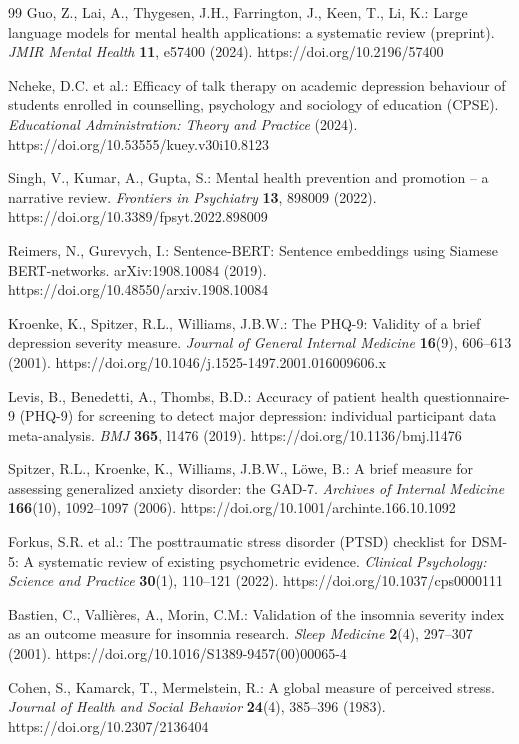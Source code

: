 \documentclass[sigconf]{acmart}
\begin{document}
\begin{thebibliography}{99}
 Guo, Z., Lai, A., Thygesen, J.H., Farrington, J., Keen, T., Li, K.: Large language models for mental health applications: a systematic review (preprint). \textit{JMIR Mental Health} \textbf{11}, e57400 (2024). https://doi.org/10.2196/57400

 Ncheke, D.C. et al.: Efficacy of talk therapy on academic depression behaviour of students enrolled in counselling, psychology and sociology of education (CPSE). \textit{Educational Administration: Theory and Practice} (2024). https://doi.org/10.53555/kuey.v30i10.8123

 Singh, V., Kumar, A., Gupta, S.: Mental health prevention and promotion -- a narrative review. \textit{Frontiers in Psychiatry} \textbf{13}, 898009 (2022). https://doi.org/10.3389/fpsyt.2022.898009

 Reimers, N., Gurevych, I.: Sentence-BERT: Sentence embeddings using Siamese BERT-networks. arXiv:1908.10084 (2019). https://doi.org/10.48550/arxiv.1908.10084

 Kroenke, K., Spitzer, R.L., Williams, J.B.W.: The PHQ-9: Validity of a brief depression severity measure. \textit{Journal of General Internal Medicine} \textbf{16}(9), 606--613 (2001). https://doi.org/10.1046/j.1525-1497.2001.016009606.x

 Levis, B., Benedetti, A., Thombs, B.D.: Accuracy of patient health questionnaire-9 (PHQ-9) for screening to detect major depression: individual participant data meta-analysis. \textit{BMJ} \textbf{365}, l1476 (2019). https://doi.org/10.1136/bmj.l1476

 Spitzer, R.L., Kroenke, K., Williams, J.B.W., L{\"o}we, B.: A brief measure for assessing generalized anxiety disorder: the GAD-7. \textit{Archives of Internal Medicine} \textbf{166}(10), 1092--1097 (2006). https://doi.org/10.1001/archinte.166.10.1092

 Forkus, S.R. et al.: The posttraumatic stress disorder (PTSD) checklist for DSM-5: A systematic review of existing psychometric evidence. \textit{Clinical Psychology: Science and Practice} \textbf{30}(1), 110--121 (2022). https://doi.org/10.1037/cps0000111

 Bastien, C., Valli{\`e}res, A., Morin, C.M.: Validation of the insomnia severity index as an outcome measure for insomnia research. \textit{Sleep Medicine} \textbf{2}(4), 297--307 (2001). https://doi.org/10.1016/S1389-9457(00)00065-4

 Cohen, S., Kamarck, T., Mermelstein, R.: A global measure of perceived stress. \textit{Journal of Health and Social Behavior} \textbf{24}(4), 385--396 (1983). https://doi.org/10.2307/2136404


\end{thebibliography}
\end{document}
